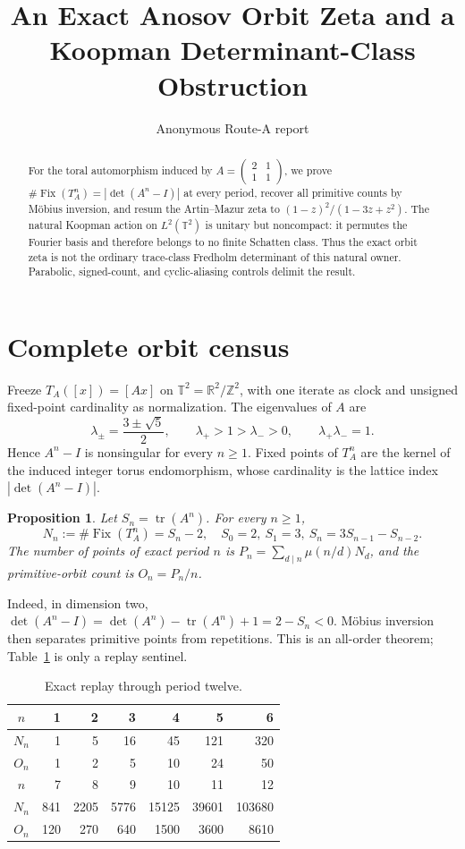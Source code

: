 \documentclass[10pt]{article}
\title{An Exact Anosov Orbit Zeta and a\\
Koopman Determinant-Class Obstruction}
\author{Anonymous Route-A report}
\date{}
\newtheorem{proposition}{Proposition}
\begin{document}
\maketitle

\begin{abstract}
For the toral automorphism induced by
$A=\left(\begin{smallmatrix}2&1\\1&1\end{smallmatrix}\right)$, we prove
$\#\operatorname{Fix}(T_A^n)=|\det(A^n-I)|$ at every period, recover all
primitive counts by M\"obius inversion, and resum the Artin--Mazur zeta to
$(1-z)^2/(1-3z+z^2)$.  The natural Koopman action on
$L^2(\mathbb T^2)$ is unitary but noncompact: it permutes the Fourier basis
and therefore belongs to no finite Schatten class.  Thus the exact orbit zeta
is not the ordinary trace-class Fredholm determinant of this natural owner.
Parabolic, signed-count, and cyclic-aliasing controls delimit the result.
\end{abstract}

\section{Complete orbit census}
Freeze $T_A([x])=[Ax]$ on $\mathbb T^2=\mathbb R^2/\mathbb Z^2$, with one
iterate as clock and unsigned fixed-point cardinality as normalization.  The
eigenvalues of $A$ are
\[
 \lambda_\pm=\frac{3\pm\sqrt5}{2},\qquad
 \lambda_+>1>\lambda_->0,\qquad \lambda_+\lambda_-=1.
\]
Hence $A^n-I$ is nonsingular for every $n\geq1$.  Fixed points of $T_A^n$
are the kernel of the induced integer torus endomorphism, whose cardinality is
the lattice index $|\det(A^n-I)|$.

\begin{proposition}
Let $S_n=\operatorname{tr}(A^n)$.  For every $n\geq1$,
\[
 N_n:=\#\operatorname{Fix}(T_A^n)=S_n-2,
 \quad S_0=2,\ S_1=3,\ S_n=3S_{n-1}-S_{n-2}.
\]
The number of points of exact period $n$ is
$P_n=\sum_{d\mid n}\mu(n/d)N_d$, and the primitive-orbit count is
$O_n=P_n/n$.
\end{proposition}

Indeed, in dimension two,
$\det(A^n-I)=\det(A^n)-\operatorname{tr}(A^n)+1=2-S_n<0$.
M\"obius inversion then separates primitive points from repetitions.  This is
an all-order theorem; Table~\ref{tab:counts} is only a replay sentinel.
\begin{table}[ht]
\centering
\scriptsize
\caption{Exact replay through period twelve.}
\label{tab:counts}
\begin{tabular}{@{}c*{6}{r}@{}}
\toprule
$n$&1&2&3&4&5&6\\ \midrule
$N_n$&1&5&16&45&121&320\\
$O_n$&1&2&5&10&24&50\\ \midrule
$n$&7&8&9&10&11&12\\ \midrule
$N_n$&841&2205&5776&15125&39601&103680\\
$O_n$&120&270&640&1500&3600&8610\\
\bottomrule
\end{tabular}
\end{table}
\end{document}
